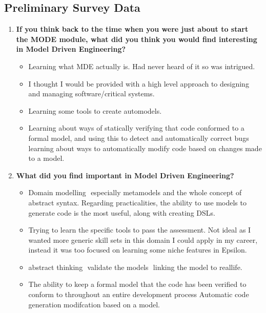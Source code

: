 \documentclass[12pt, a4paper]{report}
\begin{document}
\begin{appendices}
\chapter{Preliminary Survey Data}
\label{chap:Preliminary Survey Data}

\begin{enumerate}
\item \textbf{If you think back to the time when you were just about to start the MODE module, what did you think you would find interesting in Model ­Driven Engineering?}
\begin{itemize}
\item Learning what MDE actually is. Had never heard of it so was intrigued.
\item I thought I would be provided with a high level approach to designing and managing software/critical systems.
\item Learning some tools to create auto­models.
\item Learning about ways of statically verifying that code conformed to a formal model, and using this to detect and automatically correct bugs learning about ways to automatically modify code based on changes made to a model.
\end{itemize}

\item \textbf{What did you find important in Model­ Driven Engineering?}
\begin{itemize}
\item Domain modelling ­ especially metamodels and the whole concept of abstract syntax. Regarding practicalities, the ability to use models to generate code is the most useful, along with creating DSLs.
\item Trying to learn the specific tools to pass the assessment. Not ideal as I wanted more generic
skill sets in this domain I could apply in my career, instead it was too focused on learning some niche features in Epsilon.
\item abstract thinking ­ validate the models ­ linking the model to real­life.
\item The ability to keep a formal model that the code has been verified to conform to throughout
an entire development process Automatic code generation modifcation based on a model.
\end{itemize}


\end{enumerate}
\end{appendices}
\end{document}
